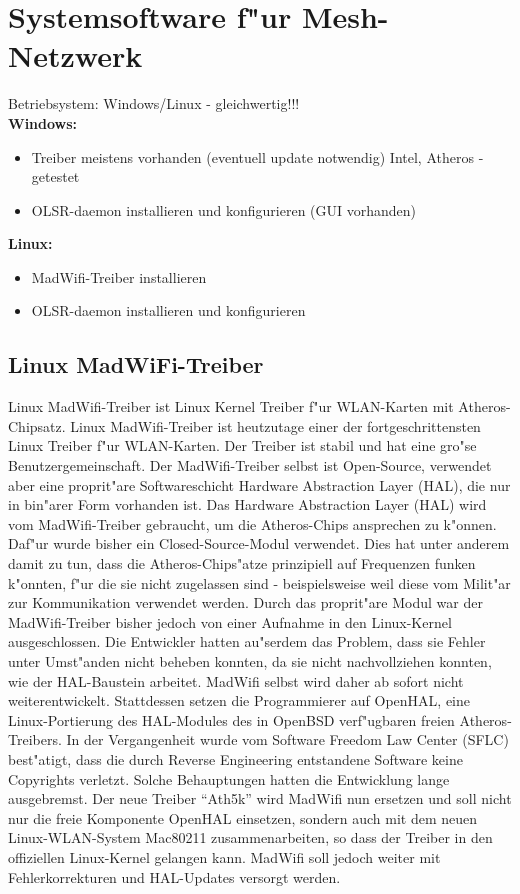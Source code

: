 \section{Systemsoftware f"ur Mesh-Netzwerk}

Betriebsystem: Windows/Linux - gleichwertig!!!\\

\textbf{Windows:} 
\begin{itemize}	
	\item Treiber meistens vorhanden (eventuell update notwendig)
	Intel, Atheros - getestet

	\item OLSR-daemon installieren und konfigurieren (GUI vorhanden) 
\end{itemize}

\textbf{Linux: }
\begin{itemize}	
	\item MadWifi-Treiber installieren 
	\item OLSR-daemon installieren und konfigurieren
\end{itemize}

\subsection{Linux MadWiFi-Treiber}

Linux MadWifi-Treiber ist Linux Kernel Treiber f"ur WLAN-Karten mit
Atheros-Chipsatz. Linux MadWifi-Treiber ist heutzutage einer der
fortgeschrittensten Linux Treiber f"ur WLAN-Karten. Der Treiber ist
stabil und hat eine gro"se Benutzergemeinschaft. Der MadWifi-Treiber
selbst ist Open-Source, verwendet aber eine proprit"are Softwareschicht
Hardware Abstraction Layer (HAL), die nur in bin"arer Form vorhanden
ist.   Das Hardware Abstraction Layer (HAL) wird vom MadWifi-Treiber
gebraucht, um die Atheros-Chips ansprechen zu k"onnen. Daf"ur wurde bisher
ein Closed-Source-Modul verwendet. Dies hat unter anderem damit zu tun,
dass die Atheros-Chips"atze prinzipiell auf Frequenzen funken k"onnten,
f"ur die sie nicht zugelassen sind - beispielsweise weil diese vom
Milit"ar zur Kommunikation verwendet werden.   Durch das proprit"are
Modul war der MadWifi-Treiber bisher jedoch von einer Aufnahme in den
Linux-Kernel ausgeschlossen. Die Entwickler hatten au"serdem das Problem,
dass sie Fehler unter Umst"anden nicht beheben konnten, da sie nicht
nachvollziehen konnten, wie der HAL-Baustein arbeitet.   MadWifi
selbst wird daher ab sofort nicht weiterentwickelt. Stattdessen
setzen die Programmierer auf OpenHAL, eine Linux-Portierung des
HAL-Modules des in OpenBSD verf"ugbaren freien Atheros-Treibers. In der
Vergangenheit wurde vom Software Freedom Law Center (SFLC) best"atigt,
dass die durch Reverse Engineering entstandene Software keine Copyrights
verletzt. Solche Behauptungen hatten die Entwicklung lange ausgebremst. 
Der neue Treiber "`Ath5k"' wird MadWifi nun ersetzen und soll nicht
nur die freie Komponente OpenHAL einsetzen, sondern auch mit dem neuen
Linux-WLAN-System Mac80211 zusammenarbeiten, so dass der Treiber in den
offiziellen Linux-Kernel gelangen kann. MadWifi soll jedoch weiter mit
Fehlerkorrekturen und HAL-Updates versorgt werden. 

